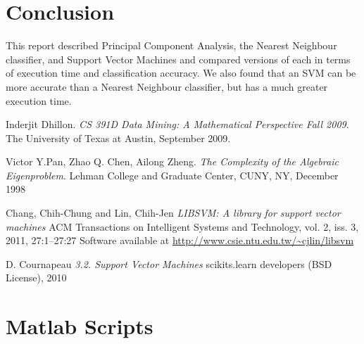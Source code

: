 \documentclass[10pt,twocolumn,letterpaper]{article}
\begin{document}
\section{Conclusion}
This report described Principal Component Analysis, the Nearest Neighbour classifier, and Support Vector Machines and compared versions of each in terms of execution time and classification accuracy. We also found that an SVM can be more accurate than a Nearest Neighbour classifier, but has a much greater execution time.
{\small


}

\begin{thebibliography}{9}
Inderjit Dhillon. 
\textit{CS 391D Data Mining: A Mathematical Perspective Fall 2009}. 
The University of Texas at Austin, September 2009.

Victor Y.Pan, Zhao Q. Chen, Ailong Zheng. 
\textit{The Complexity of the Algebraic Eigenproblem}. 
Lehman College and Graduate Center, CUNY, NY, December 1998

Chang, Chih-Chung and Lin, Chih-Jen
\textit{LIBSVM: A library for support vector machines}
ACM Transactions on Intelligent Systems and Technology, vol. 2, iss. 3, 2011, 27:1--27:27
Software available at \url{http://www.csie.ntu.edu.tw/~cjlin/libsvm}

D. Cournapeau
\textit{3.2. Support Vector Machines}
scikits.learn developers (BSD License), 2010

\end{thebibliography}

\section{Matlab Scripts}
\end{document}
